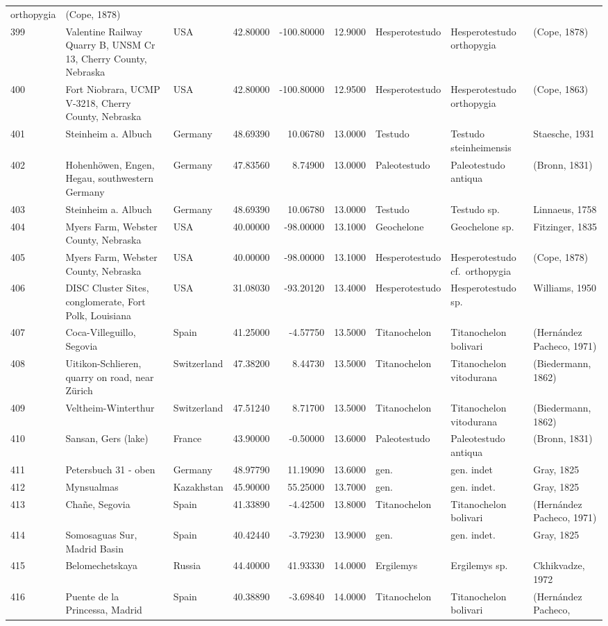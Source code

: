 \begin{landscape}
{\begin{longtable}[]{@{}lllrrrlll@{}}
orthopygia & (Cope, 1878)\tabularnewline
399 & Valentine Railway Quarry B, UNSM Cr 13, Cherry County, Nebraska &
USA & 42.80000 & -100.80000 & 12.9000 & Hesperotestudo & Hesperotestudo
orthopygia & (Cope, 1878)\tabularnewline
400 & Fort Niobrara, UCMP V-3218, Cherry County, Nebraska & USA &
42.80000 & -100.80000 & 12.9500 & Hesperotestudo & Hesperotestudo
orthopygia & (Cope, 1863)\tabularnewline
401 & Steinheim a. Albuch & Germany & 48.69390 & 10.06780 & 13.0000 &
Testudo & Testudo steinheimensis & Staesche, 1931\tabularnewline
402 & Hohenhöwen, Engen, Hegau, southwestern Germany & Germany &
47.83560 & 8.74900 & 13.0000 & Paleotestudo & Paleotestudo antiqua &
(Bronn, 1831)\tabularnewline
403 & Steinheim a. Albuch & Germany & 48.69390 & 10.06780 & 13.0000 &
Testudo & Testudo sp. & Linnaeus, 1758\tabularnewline
404 & Myers Farm, Webster County, Nebraska & USA & 40.00000 & -98.00000
& 13.1000 & Geochelone & Geochelone sp. & Fitzinger, 1835\tabularnewline
405 & Myers Farm, Webster County, Nebraska & USA & 40.00000 & -98.00000
& 13.1000 & Hesperotestudo & Hesperotestudo cf.~orthopygia & (Cope,
1878)\tabularnewline
406 & DISC Cluster Sites, conglomerate, Fort Polk, Louisiana & USA &
31.08030 & -93.20120 & 13.4000 & Hesperotestudo & Hesperotestudo sp. &
Williams, 1950\tabularnewline
407 & Coca-Villeguillo, Segovia & Spain & 41.25000 & -4.57750 & 13.5000
& Titanochelon & Titanochelon bolivari & (Hernández Pacheco,
1971)\tabularnewline
408 & Uitikon-Schlieren, quarry on road, near Zürich & Switzerland &
47.38200 & 8.44730 & 13.5000 & Titanochelon & Titanochelon vitodurana &
(Biedermann, 1862)\tabularnewline
409 & Veltheim-Winterthur & Switzerland & 47.51240 & 8.71700 & 13.5000 &
Titanochelon & Titanochelon vitodurana & (Biedermann,
1862)\tabularnewline
410 & Sansan, Gers (lake) & France & 43.90000 & -0.50000 & 13.6000 &
Paleotestudo & Paleotestudo antiqua & (Bronn, 1831)\tabularnewline
411 & Petersbuch 31 - oben & Germany & 48.97790 & 11.19090 & 13.6000 &
gen. & gen. indet & Gray, 1825\tabularnewline
412 & Mynsualmas & Kazakhstan & 45.90000 & 55.25000 & 13.7000 & gen. &
gen. indet. & Gray, 1825\tabularnewline
413 & Chañe, Segovia & Spain & 41.33890 & -4.42500 & 13.8000 &
Titanochelon & Titanochelon bolivari & (Hernández Pacheco,
1971)\tabularnewline
414 & Somosaguas Sur, Madrid Basin & Spain & 40.42440 & -3.79230 &
13.9000 & gen. & gen. indet. & Gray, 1825\tabularnewline
415 & Belomechetskaya & Russia & 44.40000 & 41.93330 & 14.0000 &
Ergilemys & Ergilemys sp. & Ckhikvadze, 1972\tabularnewline
416 & Puente de la Princessa, Madrid & Spain & 40.38890 & -3.69840 &
14.0000 & Titanochelon & Titanochelon bolivari & (Hernández Pacheco,

\end{longtable}}
\end{landscape}
